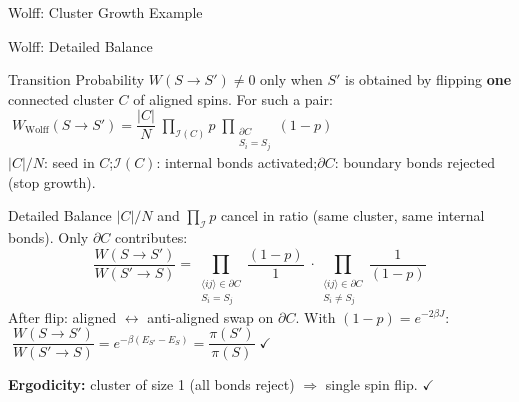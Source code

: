 \documentclass[10pt,aspectratio=169]{beamer}
\begin{document}
\begin{frame}{Wolff: Cluster Growth Example}
\end{frame}

\begin{frame}{Wolff: Detailed Balance}
  \begin{block}{Transition Probability}
    {\small $W(S \to S') \neq 0$ only when $S'$ is obtained by flipping \textbf{one} connected cluster $C$ of aligned spins. For such a pair:
    $\;W_{\mathrm{Wolff}}(S \to S') = \dfrac{|C|}{N}\;\displaystyle\prod_{\mathcal{I}(C)}\!p\;\displaystyle\prod_{\substack{\partial C \\ S_i=S_j}}\!(1-p)$}\\[3pt]
    {\footnotesize $|C|/N$: seed in $C$;\quad $\mathcal{I}(C)$: internal bonds activated;\quad $\partial C$: boundary bonds rejected (stop growth).}
  \end{block}
  \begin{exampleblock}{Detailed Balance}
    {\small $|C|/N$ and $\prod_{\mathcal{I}} p$ cancel in ratio (same cluster, same internal bonds).
    Only $\partial C$ contributes:
    \[
      \frac{W(S \to S')}{W(S' \to S)}
      = \prod_{\substack{\langle ij \rangle \in \partial C \\ S_i = S_j}}\!\frac{(1-p)}{1}
      \;\cdot\prod_{\substack{\langle ij \rangle \in \partial C \\ S_i \neq S_j}}\!\frac{1}{(1-p)}
    \]}
    {\footnotesize After flip: aligned $\leftrightarrow$ anti-aligned swap on $\partial C$.
    With $(1-p) = e^{-2\beta J}$: $\;\dfrac{W(S \to S')}{W(S' \to S)} = e^{-\beta(E_{S'}-E_S)} = \dfrac{\pi(S')}{\pi(S)}\;\checkmark$}
    \vspace{0.2em}

    {\small \textbf{Ergodicity:} cluster of size 1 (all bonds reject) $\Rightarrow$ single spin flip. $\checkmark$}
  \end{exampleblock}
\end{frame}
\end{document}
